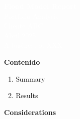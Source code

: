 \documentclass[
]{article}
\author{}
\date{\vspace{-2.5em}2025-04-21}
\begin{document}
\thispagestyle{empty}


\vspace*{6cm}

\begin{flushleft}
  {\fontsize{38}{45}\selectfont \textbf{\textcolor{white}{Flood Model Report}}} \\[0.8cm]
  {\fontsize{24}{30}\selectfont \textcolor{white}{Portfolio Analysis}} \\[1.2cm]
  {\fontsize{24}{30}\selectfont \textcolor{white}{Cliente ABC}} \\[0.4cm]
  {\Large \textcolor{white}{Abril 2025}} \\[4cm]
  {\small \textcolor{white}{A business of XXX}}
\end{flushleft}

\noindent \textbf{\textcolor{turquesa}{\fontsize{16}{20}\selectfont Contenido}}

\noindent

\begin{enumerate}
  \item {\fontsize{11}{13}\selectfont Summary \dotfill \pageref{sec:summary}}
  \item {\fontsize{11}{13}\selectfont Results \dotfill \pageref{sec:results}}
\end{enumerate}

\newpage

\noindent \textbf{\textcolor{turquesa}{\fontsize{16}{20}\selectfont Considerations}}
\vspace{0.5cm}
\end{document}
